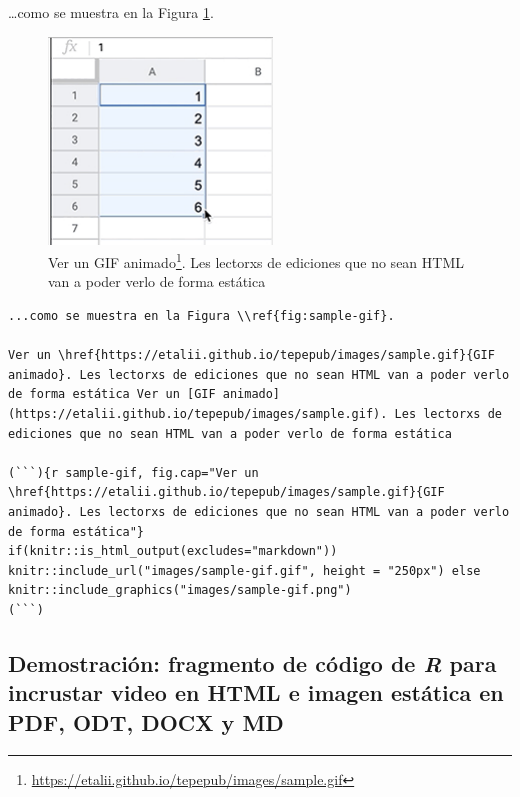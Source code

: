 \documentclass[
]{krantz}
\DeclareRobustCommand{\href}[2]{#2\footnote{\url{#1}}}
\begin{document}
\ldots como se muestra en la Figura \ref{fig:sample-gif}.



\begin{figure}
\centering
\includegraphics{images/sample-gif.pdf}
\caption{\label{fig:sample-gif}Ver un \href{https://etalii.github.io/tepepub/images/sample.gif}{GIF animado}. Les lectorxs de ediciones que no sean HTML van a poder verlo de forma estática}
\end{figure}

\begin{verbatim}
...como se muestra en la Figura \\ref{fig:sample-gif}.

Ver un \href{https://etalii.github.io/tepepub/images/sample.gif}{GIF animado}. Les lectorxs de ediciones que no sean HTML van a poder verlo de forma estática Ver un [GIF animado](https://etalii.github.io/tepepub/images/sample.gif). Les lectorxs de ediciones que no sean HTML van a poder verlo de forma estática

(```){r sample-gif, fig.cap="Ver un \href{https://etalii.github.io/tepepub/images/sample.gif}{GIF animado}. Les lectorxs de ediciones que no sean HTML van a poder verlo de forma estática"}
if(knitr::is_html_output(excludes="markdown")) knitr::include_url("images/sample-gif.gif", height = "250px") else knitr::include_graphics("images/sample-gif.png")
(```)
\end{verbatim}

\hypertarget{demostraciuxf3n-fragmento-de-cuxf3digo-de-r-para-incrustar-video-en-html-e-imagen-estuxe1tica-en-pdf-odt-docx-y-md}{%
\subsection{\texorpdfstring{Demostración: fragmento de código de \emph{R} para incrustar video en HTML e imagen estática en PDF, ODT, DOCX y MD}{Demostración: fragmento de código de R para incrustar video en HTML e imagen estática en PDF, ODT, DOCX y MD}}\label{demostraciuxf3n-fragmento-de-cuxf3digo-de-r-para-incrustar-video-en-html-e-imagen-estuxe1tica-en-pdf-odt-docx-y-md}}
\end{document}

